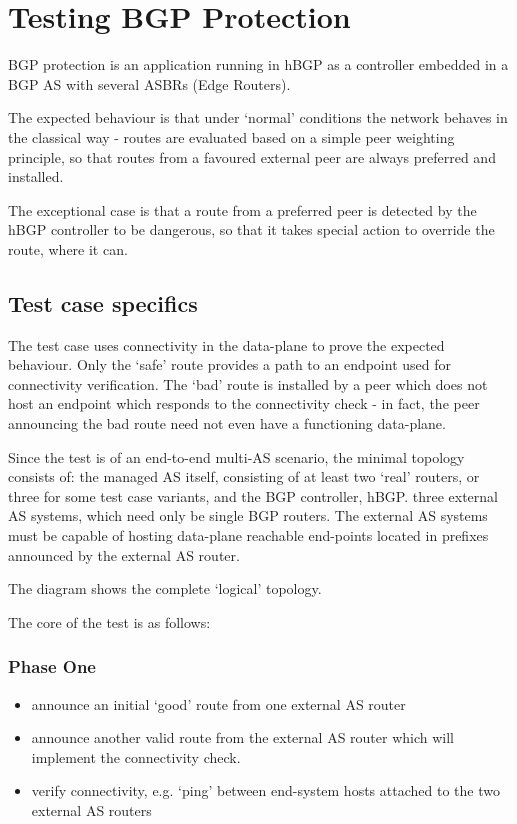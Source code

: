 \section{Testing BGP Protection}
BGP protection is an application running in hBGP as a controller embedded in a BGP AS with several ASBRs (Edge Routers).

The expected behaviour is that under `normal' conditions the network behaves in the classical way - routes are evaluated based on a simple peer weighting principle, so that routes from a favoured external peer are always preferred and installed.

The exceptional case is that a route from a preferred peer is detected by the hBGP controller to be dangerous, so that it takes special action to override the route, where it can.

\subsection{Test case specifics}

The test case uses connectivity in the data-plane to prove the expected behaviour.  Only the `safe' route provides a path to an endpoint used for connectivity verification.  The `bad' route is installed by a peer which does not host an endpoint which responds to the connectivity check - in fact, the peer announcing the bad route need not even have a functioning data-plane.

Since the test is of an end-to-end multi-AS scenario, the minimal topology consists of:
the managed AS itself, consisting of at least two `real' routers, or three for some test case variants,
and the BGP controller, hBGP.
three external AS systems, which need only be single BGP routers.  The external AS systems must be capable of hosting data-plane reachable end-points located in prefixes announced by the external AS router.

The diagram shows the complete `logical' topology.

The core of the test is as follows:

\subsubsection{Phase One}
\begin{itemize}
    \item announce an initial `good' route from one external AS router
    \item announce another valid route from the external AS router which will implement the connectivity check.
    \item verify connectivity, e.g. `ping' between end-system hosts attached to the two external AS routers
\end{itemize}

